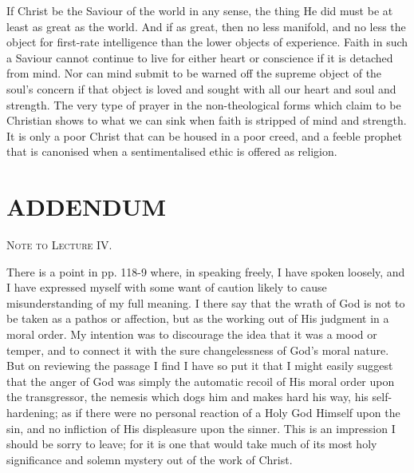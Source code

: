 \documentclass[12pt,letterpaper,oneside]{book}
\begin{document}
If Christ be the Saviour of the world in 
any sense, the thing He did must be at least as 
great as the world. And if as great, then no 
less manifold, and no less the object for first-rate 
intelligence than the lower objects of 
experience. Faith in such a Saviour cannot 
continue to live for either heart or conscience 
if it is detached from mind. Nor can mind 
submit to be warned off the supreme object of 
the soul's concern if that object is loved and 
sought with all our heart and soul and 
strength. The very type of prayer in the 
non-theological forms which claim to be Christian 
shows to what we can sink when faith is 
stripped of mind and strength. It is only a poor 
Christ that can be housed in a poor creed, and 
a feeble prophet that is canonised when a 
sentimentalised ethic is offered as religion. 


\chapter*{ADDENDUM} 




\begin{center}
\textsc{Note to Lecture IV.} 
\end{center}

There is a point in pp. 118-9 where, in speaking freely, 
I have spoken loosely, and I have expressed myself with 
some want of caution likely to cause misunderstanding 
of my full meaning. I there say that the wrath of God 
is not to be taken as a pathos or affection, but as the 
working out of His judgment in a moral order. My 
intention was to discourage the idea that it was a 
mood or temper, and to connect it with the sure changelessness 
of God's moral nature. But on reviewing the 
passage I find I have so put it that I might easily suggest 
that the anger of God was simply the automatic recoil 
of His moral order upon the transgressor, the nemesis 
which dogs him and makes hard his way, his self-hardening; 
as if there were no personal reaction of a Holy God 
Himself upon the sin, and no infliction of His displeasure 
upon the sinner. This is an impression I should be sorry 
to leave; for it is one that would take much of its most 
holy significance and solemn mystery out of the work of 
Christ. 
\end{document}
